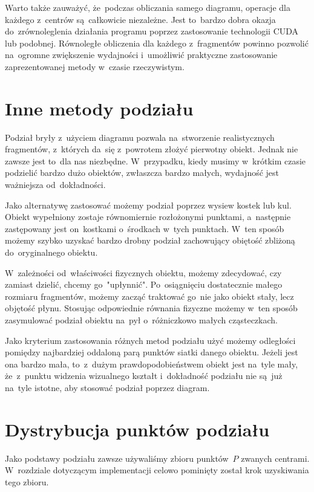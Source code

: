 \documentclass[skorowidz,autorrok,backref,xodstep,oswiadczenie]{wmimgr}
\begin{document}
Warto także zauważyć, że~podczas obliczania samego diagramu, operacje dla każdego z~centrów są~całkowicie niezależne. Jest to~bardzo dobra okazja do~zrównoleglenia działania programu poprzez zastosowanie technologii CUDA lub podobnej. Równoległe obliczenia dla każdego z~fragmentów powinno pozwolić na~ogromne zwiększenie wydajności i~umożliwić praktyczne zastosowanie zaprezentowanej metody w~czasie rzeczywistym.

\section{Inne metody podziału}

Podział bryły z~użyciem diagramu pozwala na~stworzenie realistycznych fragmentów, z~których da~się z~powrotem złożyć pierwotny obiekt. Jednak nie zawsze jest to~dla nas niezbędne. W~przypadku, kiedy musimy w~krótkim czasie podzielić bardzo dużo obiektów, zwłaszcza bardzo małych, wydajność jest ważniejsza od~dokładności.

Jako alternatywę zastosować możemy podział poprzez wysiew kostek lub kul. Obiekt wypełniony zostaje równomiernie rozłożonymi punktami, a~następnie zastępowany jest on~kostkami o~środkach w~tych punktach. W~ten sposób możemy szybko uzyskać bardzo drobny podział zachowujący obiętość zbliżoną do~oryginalnego obiektu.

W~zależności od~właściwości fizycznych obiektu, możemy zdecydować, czy zamiast dzielić, chcemy go~"upłynnić". Po~osiągnięciu dostatecznie małego rozmiaru fragmentów, możemy zacząć traktować go~nie jako obiekt stały, lecz objętość płynu. Stosując odpowiednie równania fizyczne możemy w~ten sposób zasymulować podział obiektu na~pył o~różniczkowo małych cząsteczkach.

Jako kryterium zastosowania różnych metod podziału użyć możemy odległości pomiędzy najbardziej oddaloną parą punktów siatki danego obiektu. Jeżeli jest ona bardzo mała, to~z~dużym prawdopodobieństwem obiekt jest na~tyle mały, że~z~punktu widzenia wizualnego kształt i~dokładność podziału nie są~już na~tyle istotne, aby stosować podział poprzez diagram.

\section{Dystrybucja punktów podziału}

Jako podstawy podziału zawsze używaliśmy zbioru punktów~$P$ zwanych centrami. W~rozdziale dotyczącym implementacji celowo pominięty został krok uzyskiwania tego zbioru.
\end{document}
